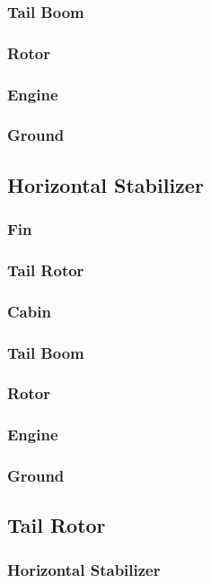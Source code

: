 \documentclass[12pt,a4paper]{article}
\begin{document}
\subsubsection{Tail Boom}
\subsubsection{Rotor}
\subsubsection{Engine}
\subsubsection{Ground}

\clearpage

\subsection{Horizontal Stabilizer}
\subsubsection{Fin}
\subsubsection{Tail Rotor}
\subsubsection{Cabin}
\subsubsection{Tail Boom}
\subsubsection{Rotor}
\subsubsection{Engine}
\subsubsection{Ground}
\subsection{Tail Rotor}
\subsubsection{Horizontal Stabilizer}
\end{document}
